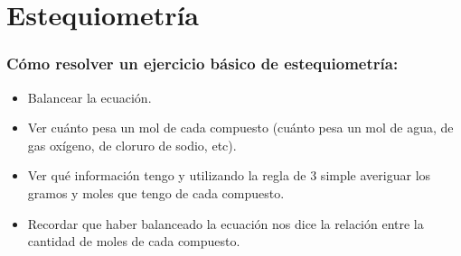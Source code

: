 \section{Estequiometría}
\subsubsection*{Cómo resolver un ejercicio básico de estequiometría:}

\begin{itemize}
    \item Balancear la ecuación.
    \item Ver cuánto pesa un mol de cada compuesto (cuánto pesa un mol de agua, de gas oxígeno, de cloruro de sodio, etc).
    \item Ver qué información tengo y utilizando la regla de 3 simple averiguar los gramos y moles que tengo de cada compuesto.
    \item Recordar que haber balanceado la ecuación nos dice la relación entre la cantidad de moles de cada compuesto.
\end{itemize}
